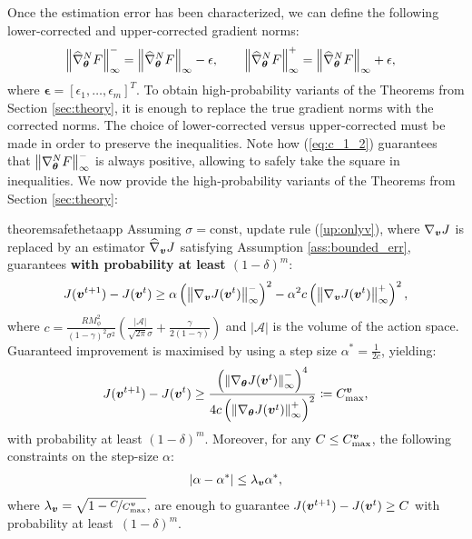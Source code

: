 Once the estimation error has been characterized,
we can define the following lower-corrected and upper-corrected gradient norms:
\begin{align*}
&\norm[\infty]{\widehat{\nabla}_{\vtheta}^NF}^- = \norm[\infty]{\widehat{\nabla}_{\vtheta}^NF} - \mathbf{\epsilon},  \qquad \norm[\infty]{\widehat{\nabla}_{\vtheta}^NF}^+ = \norm[\infty]{\widehat{\nabla}_{\vtheta}^NF} + \mathbf{\epsilon},
\end{align*}
where $\mathbf{\epsilon}=[\epsilon_1,\dots,\epsilon_m]^T$. To obtain high-probability variants of the Theorems from Section \ref{sec:theory}, it is enough to replace the true gradient norms with the corrected norms. The choice of lower-corrected versus upper-corrected must be made in order to preserve the inequalities. Note how (\ref{eq:c_1_2}) guarantees that $\norm[\infty]{\nabla_{\vtheta}^NF}^-$ is always positive, allowing to safely take the square in inequalities. We now provide the high-probability variants of the Theorems from Section \ref{sec:theory}:

\begin{restatable}{theorem}{safethetaapp}\label{th:safethetaapp}
	Assuming $\sigma = \text{const}$, update rule (\ref{up:onlyv}), where $\nabla_{\vv}J$ is replaced by an estimator $\widehat{\nabla}_{\vv}J$ satisfying Assumption \ref{ass:bounded_err}, guarantees \textbf{with probability at least $(1-\delta)^m$}:
	\begin{align}
	J(\vv^{t+1}) - J(\vv^t) \geq \alpha\left(\norm[\infty]{\gradJ[\vv]{\vv^t}}^-\right)^2 - 
	\alpha^2 c \left(\norm[\infty]{\gradJ[\vv]{\vv^t}}^+\right)^2,
	\end{align}
	where $c = \frac{RM_{\phi}^2}{(1-\gamma)^2\sigma^2}\left(\frac{|\mathcal{A}|}{\sqrt{2\pi}\sigma} +	\frac{\gamma}{2(1-\gamma)}\right)$ and  $|\mathcal{A}|$ is the volume of the action space. Guaranteed improvement is maximised by using a step size $\alpha^* = \frac{1}{2c}$, yielding:
	\begin{align}
	J(\vv^{t+1}) - J(\vv^t) \geq \frac{\left(\norm[\infty]{\gradJ{\vv^t}}^-\right)^4}{4c\left(\norm[\infty]{\gradJ{\vv^t}}^+\right)^2}
	\coloneqq C_{\text{max}}^{\vv},
	\end{align}
	with probability at least $(1-\delta)^m$. Moreover, for any $C\leq C_{\text{max}}^{\vv}$, the following constraints on the step-size $\alpha$:
	\begin{align}
	|\alpha - \alpha^*| \leq \lambda_{\vv}\alpha^*, 
	\end{align}
	where $\lambda_{\vv}=\sqrt{1 - \nicefrac{C}{C_{\text{max}}^{\vv}}}$, are enough to guarantee $J(\vv^{t+1}) - J(\vv^t)\geq C$ with probability at least~${(1-\delta)^m}$.
\end{restatable}

